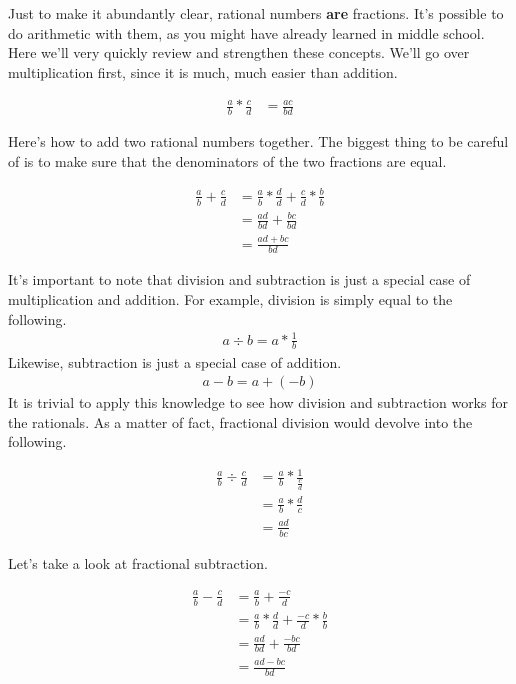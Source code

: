 Just to make it abundantly clear, rational numbers \textbf{are} fractions. It's possible to do arithmetic with them, as you might have already learned in middle school. Here we'll very quickly review and strengthen these concepts. We'll go over multiplication first, since it is much, much easier than addition.

\begin{align*}
    \frac{a}{b} * \frac{c}{d} &= \frac{ac}{bd}
\end{align*}

Here's how to add two rational numbers together. The biggest thing to be careful of is to make sure that the denominators of the two fractions are equal.

\begin{align*}
    \frac{a}{b} + \frac{c}{d} &= \frac{a}{b} * \frac{d}{d} + \frac{c}{d} * \frac{b}{b}\\
    &= \frac{ad}{bd} + \frac{bc}{bd}\\
    &= \frac{ad + bc}{bd}
\end{align*}

It's important to note that division and subtraction is just a special case of multiplication and addition. For example, division is simply equal to the following.
\begin{align*}
    a \div b = a * \frac{1}{b}
\end{align*}
Likewise, subtraction is just a special case of addition.
\begin{align*}
    a - b = a + (-b)
\end{align*}
It is trivial to apply this knowledge to see how division and subtraction works for the rationals. As a matter of fact, fractional division would devolve into the following.

\begin{align*}
    \frac{a}{b} \div \frac{c}{d} &= \frac{a}{b} * \frac{1}{\frac{c}{d}} \\
    &= \frac{a}{b} * \frac{d}{c} \\
    &= \frac{ad}{bc}
\end{align*}

Let's take a look at fractional subtraction. 

\begin{align*}
    \frac{a}{b} - \frac{c}{d} &= \frac{a}{b} + \frac{-c}{d}\\
    &= \frac{a}{b} * \frac{d}{d} + \frac{-c}{d} * \frac{b}{b}\\
    &= \frac{ad}{bd} + \frac{-bc}{bd}\\
    &= \frac{ad - bc}{bd}
\end{align*}

